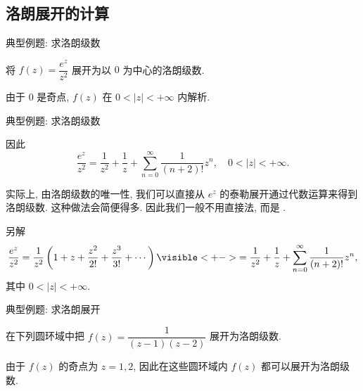 \subsection{洛朗展开的计算}
\begin{frame}{典型例题: 求洛朗级数}
\beqskip{9pt}
\onslide<+->
\begin{example}
将 $f(z)=\dfrac{e^z}{z^2}$ 展开为以 $0$ 为中心的洛朗级数.
\end{example}
\onslide<+->
\begin{solution}
由于 $0$ 是奇点, $f(z)$ 在 $0<|z|<+\infty$ 内解析.
\end{solution}
\endgroup
\end{frame}


\begin{frame}{典型例题: 求洛朗级数}
\onslide<+->
\begin{solutionc}
因此
\vspace{-\baselineskip}
\[\frac{e^z}{z^2}=\frac1{z^2}+\frac1z+\sum_{n=0}^\infty \frac1{(n+2)!}z^n,\quad 0<|z|<+\infty.\]
\vspace{-10pt}
\end{solutionc}
\onslide<+->
实际上, 由洛朗级数的唯一性, 我们可以直接从 $e^z$ 的泰勒展开通过代数运算来得到洛朗级数.
\onslide<+->
这种做法会简便得多.
\onslide<+->
因此我们一般\alert{不用直接法}, 而是 .
\begin{block}{另解}
\vspace{-\baselineskip}
\[\frac{e^z}{z^2}=\frac1{z^2}\left(1+z+\frac{z^2}{2!}+\frac{z^3}{3!}+\cdots\right)
\visible<+->{=\frac1{z^2}+\frac1z+\sum_{n=0}^\infty \frac1{(n+2)!}z^n,}\]
其中 $0<|z|<+\infty$.
\end{block}
\end{frame}


\begin{frame}{典型例题: 求洛朗展开}
\onslide<+->
\begin{example}
在下列圆环域中把 $f(z)=\dfrac1{(z-1)(z-2)}$ 展开为洛朗级数.

\end{example}
\onslide<+->
\begin{solution}
由于 $f(z)$ 的奇点为 $z=1,2$, 因此在这些圆环域内 $f(z)$ 都可以展开为洛朗级数.
\end{solution}
\end{frame}



